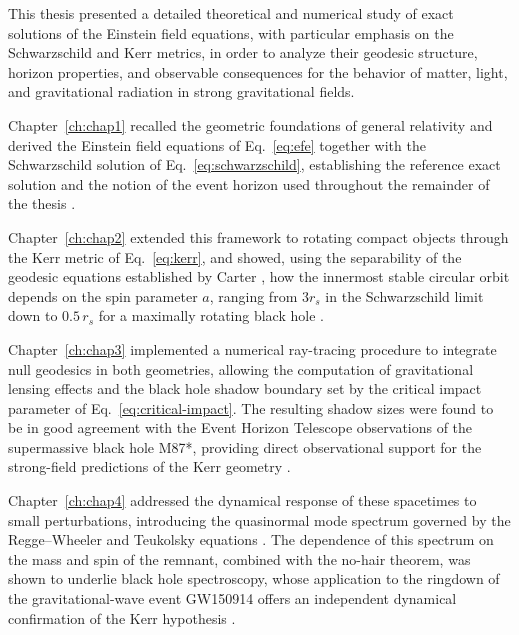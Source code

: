 \cleardoublepage
{}
{}
\label{ch:conclusion}

This thesis presented a detailed theoretical and numerical study of exact solutions of the Einstein field equations, with particular emphasis on the Schwarzschild and Kerr metrics, in order to analyze their geodesic structure, horizon properties, and observable consequences for the behavior of matter, light, and gravitational radiation in strong gravitational fields.

Chapter~\ref{ch:chap1} recalled the geometric foundations of general relativity and derived the Einstein field equations of Eq.~\eqref{eq:efe} together with the Schwarzschild solution of Eq.~\eqref{eq:schwarzschild}, establishing the reference exact solution and the notion of the event horizon used throughout the remainder of the thesis \cite{einstein1916,schwarzschild1916}.

Chapter~\ref{ch:chap2} extended this framework to rotating compact objects through the Kerr metric of Eq.~\eqref{eq:kerr}, and showed, using the separability of the geodesic equations established by Carter \cite{carter1968}, how the innermost stable circular orbit depends on the spin parameter $a$, ranging from $3r_s$ in the Schwarzschild limit down to $0.5\,r_s$ for a maximally rotating black hole \cite{bardeen1972}.

Chapter~\ref{ch:chap3} implemented a numerical ray-tracing procedure to integrate null geodesics in both geometries, allowing the computation of gravitational lensing effects and the black hole shadow boundary set by the critical impact parameter of Eq.~\eqref{eq:critical-impact}. The resulting shadow sizes were found to be in good agreement with the Event Horizon Telescope observations of the supermassive black hole M87*, providing direct observational support for the strong-field predictions of the Kerr geometry \cite{eht2019}.

Chapter~\ref{ch:chap4} addressed the dynamical response of these spacetimes to small perturbations, introducing the quasinormal mode spectrum governed by the Regge--Wheeler and Teukolsky equations \cite{regge1957,teukolsky1973}. The dependence of this spectrum on the mass and spin of the remnant, combined with the no-hair theorem, was shown to underlie black hole spectroscopy, whose application to the ringdown of the gravitational-wave event GW150914 offers an independent dynamical confirmation of the Kerr hypothesis \cite{ligo2016,isi2019}.

